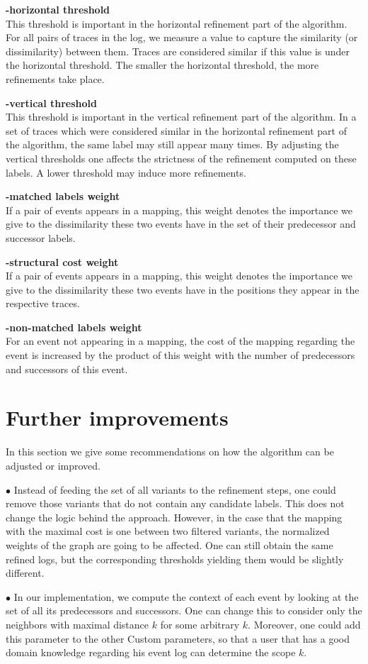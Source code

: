 \documentclass[notitlepage]{article}
\begin{document}
\begin{flushleft}
\textbf{-horizontal threshold}\\
This threshold is important in the horizontal refinement part of the algorithm.
For all pairs of traces in the log, we measure a value to capture the similarity (or dissimilarity) between them.
Traces are considered similar if this value is under the horizontal threshold.
The smaller the horizontal threshold, the more refinements take place.
\medskip

\textbf{-vertical threshold}\\
This threshold is important in the vertical refinement part of the algorithm.
In a set of traces which were considered similar in the horizontal refinement part of the algorithm, the same label may still appear many times.
By adjusting the vertical thresholds one affects the strictness of the refinement computed on these labels.
A lower threshold may induce more refinements.
\medskip

\textbf{-matched labels weight}\\
If a pair of events appears in a mapping, this weight denotes the importance we give to the dissimilarity these two events have in the set of their predecessor and successor labels.
\medskip

\textbf{-structural cost weight}\\
If a pair of events appears in a mapping, this weight denotes the importance we give to the dissimilarity these two events have in the positions they appear in the respective traces.
\medskip

\textbf{-non-matched labels weight}\\
For an event not appearing in a mapping, the cost of the mapping regarding the event is increased by the product of this weight with the number of predecessors and successors of this event.
\medskip


\section{Further improvements}
In this section we give some recommendations on how the algorithm can be adjusted or improved.
\medskip

$\bullet$
Instead of feeding the set of all variants to the refinement steps, one could remove those variants that do not contain any candidate labels.
This does not change the logic behind the approach.
However, in the case that the mapping with the maximal cost is one between two filtered variants, the normalized weights of the graph are going to be affected.
One can still obtain the same refined logs, but the corresponding thresholds yielding them would be slightly different.
\medskip

$\bullet$
In our implementation, we compute the context of each event by looking at the set of all its predecessors and successors.
One can change this to consider only the neighbors with maximal distance $k$ for some arbitrary $k$.
Moreover, one could add this parameter to the other Custom parameters, so that a user that has a good domain knowledge regarding his event log can determine the scope $k$.

\end{flushleft}
\end{document}
